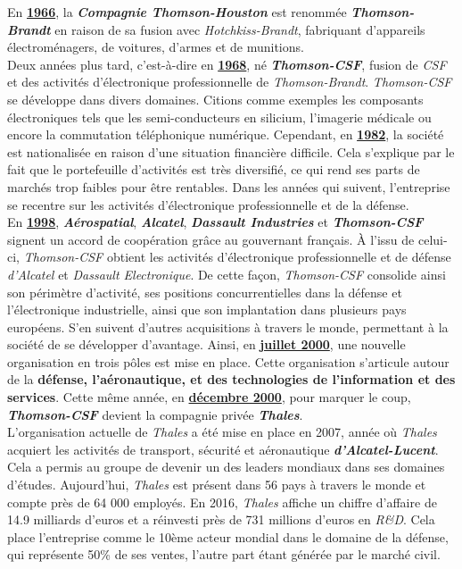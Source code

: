 \documentclass[10pt, oneside, a4paper]{article}
\begin{document}
En \underline{\textbf{1966}}, la \textbf{\textit{Compagnie Thomson-Houston}} est renommée \textbf{\textit{Thomson-Brandt}} en raison de sa fusion avec \textit{Hotchkiss-Brandt}, fabriquant d'appareils électroménagers, de voitures, d'armes et de munitions. \\

Deux années plus tard, c'est-à-dire en \underline{\textbf{1968}}, né \textbf{\textit{Thomson-CSF}}, fusion de \textit{CSF} et des activités d'électronique professionnelle de \textit{Thomson-Brandt}. \textit{Thomson-CSF} se développe dans divers domaines. Citions comme exemples les composants électroniques tels que les semi-conducteurs en silicium, l'imagerie médicale ou encore la commutation téléphonique numérique. Cependant, en \underline{\textbf{1982}}, la société est nationalisée en raison d’une situation financière difficile. Cela s’explique par le fait que le portefeuille d’activités est très diversifié, ce qui rend ses parts de marchés trop faibles pour être rentables. Dans les années qui suivent, l’entreprise se recentre sur les activités d’électronique professionnelle et de la défense. \\

En \underline{\textbf{1998}}, \textbf{\textit{Aérospatial}}, \textbf{\textit{Alcatel}}, \textbf{\textit{Dassault Industries}} et \textbf{\textit{Thomson-CSF}} signent un accord de coopération grâce au gouvernant français. À l’issu de celui-ci, \textit{Thomson-CSF} obtient les activités d’électronique professionnelle et de défense \textit{d’Alcatel} et \textit{Dassault Electronique}. De cette façon, \textit{Thomson-CSF} consolide ainsi son périmètre d'activité, ses positions concurrentielles dans la défense et l'électronique industrielle, ainsi que son implantation dans plusieurs pays européens. S'en suivent d’autres acquisitions à travers le monde, permettant à la société de se développer d’avantage. Ainsi, en \underline{\textbf{juillet 2000}}, une nouvelle organisation en trois pôles est mise en place. Cette organisation s'articule autour de la \textbf{défense, l'aéronautique, et des technologies de l'information et des services}. Cette même année, en \underline{\textbf{décembre 2000}}, pour marquer le coup, \textbf{\textit{Thomson-CSF}} devient la compagnie privée \textbf{\textit{Thales}}. \\

L’organisation actuelle de \textit{Thales} a été mise en place en 2007, année où \textit{Thales} acquiert les activités de transport, sécurité et aéronautique \textbf{\textit{d’Alcatel-Lucent}}. Cela a permis au groupe de devenir un des leaders mondiaux dans ses domaines d’études. Aujourd’hui, \textit{Thales} est présent dans 56 pays à travers le monde et compte près de 64 000 employés. En 2016, \textit{Thales} affiche un chiffre d’affaire de 14.9 milliards d’euros et a réinvesti près de 731 millions d’euros en \textit{R\&D}. Cela place l’entreprise comme le 10ème acteur mondial dans le domaine de la défense, qui représente 50\% de ses ventes, l’autre part étant générée par le marché civil. \\
\end{document}
